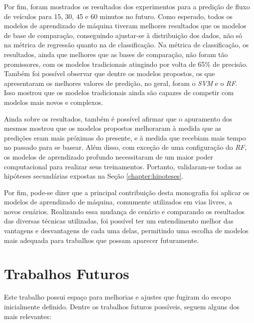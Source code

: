 Por fim, foram mostrados os resultados dos experimentos para a predição de fluxo de veículos para 15, 30, 45 e 60 minutos no futuro. Como esperado, todos os modelos de aprendizado de máquina tiveram melhores resultados que os modelos de base de comparação, conseguindo ajustar-se à distribuição dos dados, não só na métrica de regressão quanto na de classificação. Na métrica de classificação, os resultados, ainda que melhores que as bases de comparação, não foram tão promissores, com os modelos tradicionais atingindo por volta de 65\% de precisão. Também foi possível observar que dentre os modelos propostos, os que apresentaram os melhores valores de predição, no geral, foram o \textit{\acrshort{SVM}} e o \textit{\acrshort{RF}}. Isso mostrou que os modelos tradicionais ainda são capazes de competir com modelos mais novos e complexos. 

Ainda sobre os resultados, também é possível afirmar que o apuramento dos mesmos mostrou que os modelos propostos melhoraram à medida que as predições eram mais próximas do presente, e à medida que recebiam mais tempo no passado para se basear. Além disso, com exceção de uma configuração do \textit{\acrshort{RF}}, os modelos de aprendizado profundo necessitaram de um maior poder computacional para realizar seus treinamentos. Portanto, validaram-se todas as hipóteses secundárias expostas na Seção \ref{chapter:hipoteses}.

Por fim, pode-se dizer que a principal contribuição desta monografia foi aplicar os modelos de aprendizado de máquina, comumente utilizados em vias livres, a novos cenários. Realizando essa mudança de cenário e comparando os resultados das diversas técnicas utilizadas, foi possível ter um entendimento melhor das vantagens e desvantagens de cada uma delas, permitindo uma escolha de modelos mais adequada para trabalhos que possam aparecer futuramente.

\section{Trabalhos Futuros}

Este trabalho possui espaço para melhorias e ajustes que fugiram do escopo inicialmente definido. Dentre os trabalhos futuros possíveis, seguem alguns dos mais relevantes:

